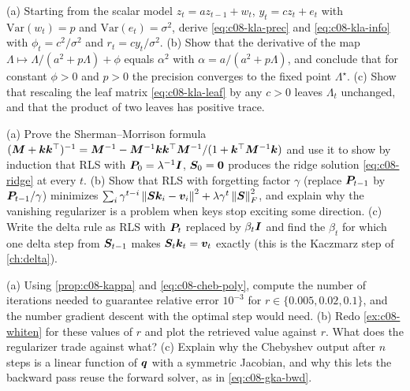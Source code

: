 \begin{exercise}\label{ex:c08-ex-info}
(a) Starting from the scalar model $z_t=az_{t-1}+w_t$, $y_t=cz_t+e_t$ with $\mathrm{Var}(w_t)=p$ and
$\mathrm{Var}(e_t)=\sigma^2$, derive \eqref{eq:c08-kla-prec} and \eqref{eq:c08-kla-info} with
$\phi_t=c^2/\sigma^2$ and $r_t=cy_t/\sigma^2$. (b) Show that the derivative of the map
$\Lambda\mapsto\Lambda/(a^2+p\Lambda)+\phi$ equals $\alpha^2$ with $\alpha=a/(a^2+p\Lambda)$, and
conclude that for constant $\phi>0$ and $p>0$ the precision converges to the fixed point
$\Lambda^\star$. (c) Show that rescaling the leaf matrix \eqref{eq:c08-kla-leaf} by any $c>0$ leaves
$\Lambda_t$ unchanged, and that the product of two leaves has positive trace.
\end{exercise}

\begin{exercise}\label{ex:c08-ex-rls}
(a) Prove the Sherman--Morrison formula $(\bm{M}+\bm{k}\bm{k}^{\top})^{-1}=\bm{M}^{-1}-\bm{M}^{-1}\bm{k}\bm{k}^{\top}
\bm{M}^{-1}/(1+\bm{k}^{\top}\bm{M}^{-1}\bm{k})$ and use it to show by induction that RLS with
$\bm{P}_0=\lambda^{-1}\bm{I}$, $\bm{S}_0=\bm{0}$ produces the ridge solution \eqref{eq:c08-ridge} at every $t$.
(b) Show that RLS with forgetting factor $\gamma$ (replace $\bm{P}_{t-1}$ by $\bm{P}_{t-1}/\gamma$) minimizes
$\sum_i\gamma^{t-i}\left\lVert \bm{S}\bm{k}_i-\bm{v}_i\right\rVert^2+\lambda\gamma^t\left\lVert \bm{S}\right\rVert_F^2$, and explain why the vanishing
regularizer is a problem when keys stop exciting some direction. (c) Write the delta rule as RLS with
$\bm{P}_t$ replaced by $\beta_t\bm{I}$ and find the $\beta_t$ for which one delta step from $\bm{S}_{t-1}$ makes
$\bm{S}_t\bm{k}_t=\bm{v}_t$ exactly (this is the Kaczmarz step of \cref{ch:delta}).
\end{exercise}

\begin{exercise}\label{ex:c08-ex-cheb}
(a) Using \cref{prop:c08-kappa} and \eqref{eq:c08-cheb-poly}, compute the number of iterations needed
to guarantee relative error $10^{-3}$ for $r\in\{0.005,0.02,0.1\}$, and the number gradient descent
with the optimal step would need. (b) Redo \cref{ex:c08-whiten} for these values of $r$ and plot the
retrieved value against $r$. What does the regularizer trade against what? (c) Explain why the
Chebyshev output after $n$ steps is a linear function of $\bm{q}$ with a symmetric Jacobian, and why
this lets the backward pass reuse the forward solver, as in \eqref{eq:c08-gka-bwd}.
\end{exercise}

